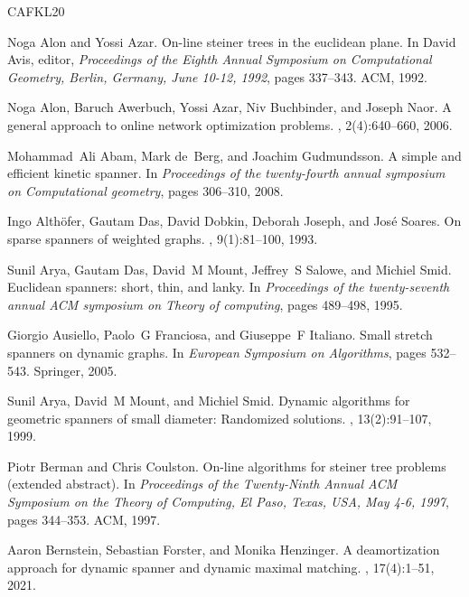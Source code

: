 \documentclass[11pt]{article}
\begin{document}
\newcommand{\etalchar}[1]{$^{#1}$}
\begin{thebibliography}{CAFKL20}

Noga Alon and Yossi Azar.
\newblock On-line steiner trees in the euclidean plane.
\newblock In David Avis, editor, {\em Proceedings of the Eighth Annual
  Symposium on Computational Geometry, Berlin, Germany, June 10-12, 1992},
  pages 337--343. {ACM}, 1992.

\bibitem[AAA{\etalchar{+}}06]{AlonAABN06}
Noga Alon, Baruch Awerbuch, Yossi Azar, Niv Buchbinder, and Joseph Naor.
\newblock A general approach to online network optimization problems.
, 2(4):640--660, 2006.

Mohammad~Ali Abam, Mark de~Berg, and Joachim Gudmundsson.
\newblock A simple and efficient kinetic spanner.
\newblock In {\em Proceedings of the twenty-fourth annual symposium on
  Computational geometry}, pages 306--310, 2008.

\bibitem[ADD{\etalchar{+}}93]{althofer1993sparse}
Ingo Alth{\"o}fer, Gautam Das, David Dobkin, Deborah Joseph, and Jos{\'e}
  Soares.
\newblock On sparse spanners of weighted graphs.
, 9(1):81--100, 1993.

\bibitem[ADM{\etalchar{+}}95]{arya1995euclidean}
Sunil Arya, Gautam Das, David~M Mount, Jeffrey~S Salowe, and Michiel Smid.
\newblock Euclidean spanners: short, thin, and lanky.
\newblock In {\em Proceedings of the twenty-seventh annual ACM symposium on
  Theory of computing}, pages 489--498, 1995.

Giorgio Ausiello, Paolo~G Franciosa, and Giuseppe~F Italiano.
\newblock Small stretch spanners on dynamic graphs.
\newblock In {\em European Symposium on Algorithms}, pages 532--543. Springer,
  2005.

Sunil Arya, David~M Mount, and Michiel Smid.
\newblock Dynamic algorithms for geometric spanners of small diameter:
  Randomized solutions.
, 13(2):91--107, 1999.

Piotr Berman and Chris Coulston.
\newblock On-line algorithms for steiner tree problems (extended abstract).
\newblock In {\em Proceedings of the Twenty-Ninth Annual {ACM} Symposium on the
  Theory of Computing, El Paso, Texas, USA, May 4-6, 1997}, pages 344--353.
  {ACM}, 1997.

Aaron Bernstein, Sebastian Forster, and Monika Henzinger.
\newblock A deamortization approach for dynamic spanner and dynamic maximal
  matching.
, 17(4):1--51, 2021.


\end{thebibliography}
\end{document}
